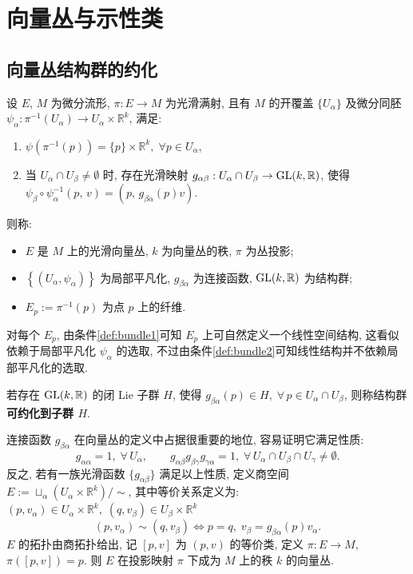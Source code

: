 \chapter{向量丛与示性类}
    \section{向量丛结构群的约化}
    \begin{definition}[向量丛的定义]
        设 $E$, $M$ 为微分流形, $\pi:E\rightarrow M$ 为光滑满射, 且有 $M$ 的开覆盖 $\{U_{\alpha}\}$ 
        及微分同胚 $\psi_{\alpha}:\pi^{-1}(U_{\alpha})\rightarrow U_{\alpha}\times\mathbb{R}^k$, 满足:
        \begin{enumerate}
            \item\label{def:bundle1} $\psi(\pi^{-1}(p))=\{p\}\times\mathbb{R}^k,\;\forall p\in U_{\alpha}$,
            \item\label{def:bundle2} 当 $U_{\alpha}\cap U_{\beta}\neq\emptyset$ 时, 存在光滑映射 $g_{\alpha\beta}:U_{\alpha}\cap U_{\beta}\rightarrow{\rm GL}(k,\mathbb{R})$, 使得 $\psi_{\beta}\circ\psi_{\alpha}^{-1}(p,\,v)=(p,\,g_{\beta\alpha}(p)v)$.
        \end{enumerate}
        则称:
        \begin{itemize}
            \item $E$ 是 $M$ 上的光滑向量丛, $k$ 为向量丛的秩, $\pi$ 为丛投影;
            \item $\left\{(U_{\alpha}, \psi_{\alpha})\right\}$ 为局部平凡化, $g_{\beta\alpha}$ 为连接函数, ${\rm GL}(k,\mathbb{R})$ 为结构群;
            \item $E_p:=\pi^{-1}(p)$ 为点 $p$ 上的纤维.
        \end{itemize}
        对每个 $E_p$, 由条件\ref{def:bundle1}可知 $E_p$ 上可自然定义一个线性空间结构, 这看似依赖于局部平凡化 $\psi_{\alpha}$ 的选取, 不过由条件\ref{def:bundle2}可知线性结构并不依赖局部平凡化的选取.
        
        若存在 ${\rm GL}(k,\mathbb{R})$ 的闭 {\rm Lie} 子群 $H$, 使得 $g_{\beta\alpha}(p)\in H,\;\forall\,p\in U_{\alpha}\cap U_{\beta}$, 则称结构群{\bf 可约化到子群 $H$}.
    \end{definition}

    连接函数 $g_{\beta\alpha}$ 在向量丛的定义中占据很重要的地位, 容易证明它满足性质:
    \begin{equation*}
        g_{\alpha\alpha} = 1,\;\forall\,U_{\alpha},\qquad g_{\alpha\beta}g_{\beta\gamma}g_{\gamma\alpha} = 1,\;\forall\,U_{\alpha}\cap U_{\beta}\cap U_{\gamma}\neq\emptyset.
    \end{equation*}
    反之, 若有一族光滑函数 $\{g_{\alpha\beta}\}$ 满足以上性质, 定义商空间 $E:=\sqcup_{\alpha}(U_{\alpha}\times\mathbb{R}^k)\big/\sim$, 其中等价关系定义为: $(p,v_{\alpha})\in U_{\alpha}\times\mathbb{R}^k,\;(q,v_{\beta})\in U_{\beta}\times\mathbb{R}^k$
    \begin{equation*}
        (p,v_{\alpha})\sim(q,v_{\beta})\Leftrightarrow p=q,\;v_{\beta}=g_{\beta\alpha}(p)v_{\alpha}.
    \end{equation*}
    $E$ 的拓扑由商拓扑给出, 记 $[p,v]$ 为 $(p,v)$ 的等价类, 定义 $\pi:E\rightarrow M$, $\pi([p,v])=p$. 则 $E$ 在投影映射 $\pi$ 下成为 $M$ 上的秩 $k$ 的向量丛. 

